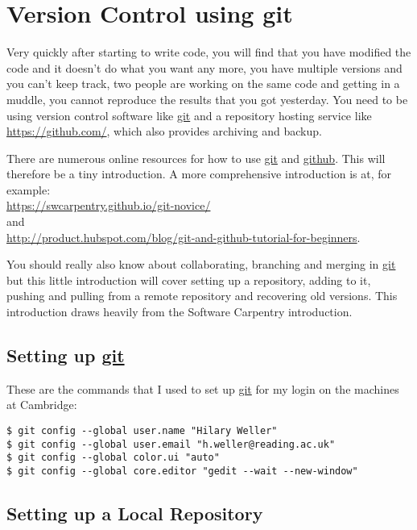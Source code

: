 \section{Version Control using git\label{sec:git}}

Very quickly after starting to write code, you will find that you
have modified the code and it doesn't do what you want any more, you
have multiple versions and you can't keep track, two people are working
on the same code and getting in a muddle, you cannot reproduce the
results that you got yesterday. You need to be using version control
software like \url{git} and a repository hosting service like \url{https://github.com/},
which also provides archiving and backup.

\pause There are numerous online resources for how to use \url{git}
and \url{github}. This will therefore be a tiny introduction. A more
comprehensive introduction is at, for example:\\
\url{https://swcarpentry.github.io/git-novice/}\\
and\\
{\small{}\url{http://product.hubspot.com/blog/git-and-github-tutorial-for-beginners}}.

You should really also know about collaborating, branching and merging
in \url{git} but this little introduction will cover setting up a
repository, adding to it, pushing and pulling from a remote repository
and recovering old versions. This introduction draws heavily from
the Software Carpentry introduction. \pause 

\subsection{Setting up \protect\url{git}}

These are the commands that I used to set up \url{git} for my login
on the machines at Cambridge:

\begin{lstlisting}
$ git config --global user.name "Hilary Weller"
$ git config --global user.email "h.weller@reading.ac.uk"
$ git config --global color.ui "auto"
$ git config --global core.editor "gedit --wait --new-window"
\end{lstlisting}

\clearpage{}

\subsection{Setting up a Local Repository}

